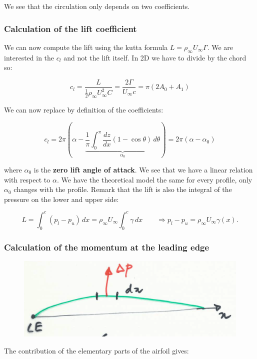 	We see that the circulation only depends on two coefficients. 
	
\subsubsection{Calculation of the lift coefficient}
We can now compute the lift using the kutta formula $L = \rho _\infty U_\infty \Gamma$. We are interested in the $c_l$ and not the lift itself. In 2D we have to divide by the chord so: 
	
	\begin{equation}
	c_l = \frac{L}{\frac{1}{2} \rho _\infty U_\infty ^2 C} = \frac{2\Gamma}{U_\infty c} = \pi (2A_0 + A_1)
	\label{eq:2.70}
	\end{equation}
	
	We can now replace by definition of the coefficients: 
	
	\begin{equation}
	c_l = 2\pi\left(\alpha - \underbrace{\frac{1}{\pi} \int _0^\pi \frac{dz}{dx} (1-\cos \theta)\, d\theta}_{\alpha _0} \right) = 2\pi (\alpha - \alpha _0)
	\label{eq:2.71}
	\end{equation}
	
	where $\alpha _0$ is the \textbf{zero lift angle of attack}. We see that we have a linear relation with respect to $\alpha$. We have the theoretical model the same for every profile, only $\alpha _0$ changes with the profile. Remark that the lift is also the integral of the pressure on the lower and upper side:
	
	\begin{equation}
	L = \int _0 ^c (p_l - p_u) \, dx = \rho _\infty U_\infty \int _0 ^c \gamma \, dx \qquad \Rightarrow p_l - p_u = \rho _\infty U_\infty \gamma (x).
	\end{equation}
	
\subsubsection{Calculation of the momentum at the leading edge}
	\begin{figure}
	\vspace{-5mm}
	\includegraphics[scale=0.1]{ch2/34}
	\end{figure}
	The contribution of the elementary parts of the airfoil gives:
	
